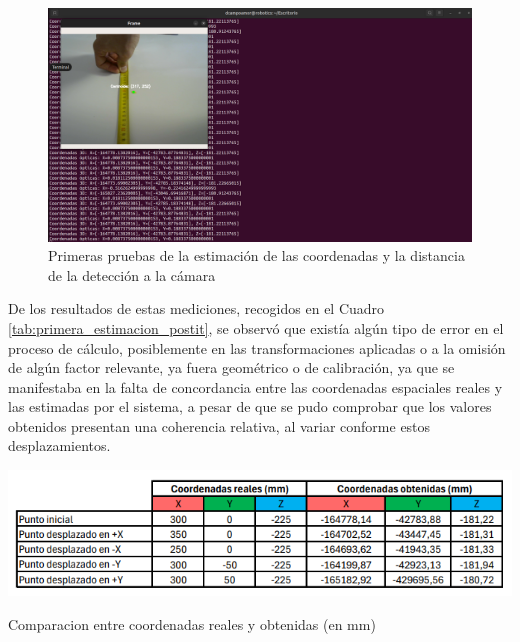   \begin{figure}[H]
     \centering
     \begin{center}
       \includegraphics[width=115mm]{figs/Punto inicial 30cm.png}
     \end{center}
     \caption{Primeras pruebas de la estimación de las coordenadas y la distancia de la detección a la cámara}
    \label{fig:primera_estimacion_postit}
  \end{figure}

De los resultados de estas mediciones, recogidos en el Cuadro \ref{tab:primera_estimacion_postit}, se observó que existía algún tipo de error en el proceso de cálculo, posiblemente en las transformaciones aplicadas o a la omisión de algún factor relevante, ya fuera geométrico o de calibración, ya que se manifestaba en la falta de concordancia entre las coordenadas espaciales reales y las estimadas por el sistema, a pesar de que se pudo comprobar que los valores obtenidos presentan una coherencia relativa, al variar conforme estos desplazamientos.

  \begin{table}[H]
     \centering
     \begin{center}
       \includegraphics[width=140mm]{figs/Primer resultados postit.png}
     \end{center}
     \caption{Comparacion entre coordenadas reales y obtenidas (en mm)}
    \label{tab:primera_estimacion_postit}
  \end{table}

